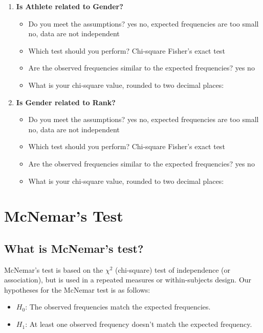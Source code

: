 \documentclass[
]{book}
\begin{document}
\begin{enumerate}
\def\labelenumi{\arabic{enumi}.}
\item
  \textbf{Is Athlete related to Gender?}

  \begin{itemize}
  \item
    Do you meet the assumptions? yes no, expected frequencies are too small no, data are not independent
  \item
    Which test should you perform? Chi-square Fisher's exact test
  \item
    Are the observed frequencies similar to the expected frequencies? yes no
  \item
    What is your chi-square value, rounded to two decimal places:
  \end{itemize}
\item
  \textbf{Is Gender related to Rank?}

  \begin{itemize}
  \item
    Do you meet the assumptions? yes no, expected frequencies are too small no, data are not independent
  \item
    Which test should you perform? Chi-square Fisher's exact test
  \item
    Are the observed frequencies similar to the expected frequencies? yes no
  \item
    What is your chi-square value, rounded to two decimal places:
  \end{itemize}
\end{enumerate}

\hypertarget{mcnemars-test}{%
\chapter{McNemar's Test}\label{mcnemars-test}}

\hypertarget{what-is-mcnemars-test}{%
\section{What is McNemar's test?}\label{what-is-mcnemars-test}}

McNemar's test is based on the \(\chi^2\) (chi-square) test of independence (or association), but is used in a repeated measures or within-subjects design. Our hypotheses for the McNemar test is as follows:

\begin{itemize}
\item
  \(H_0\): The observed frequencies match the expected frequencies.
\item
  \(H_1\): At least one observed frequency doesn't match the expected frequency.
\end{itemize}
\end{document}
